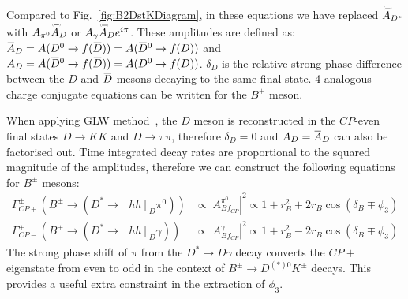 \documentclass[oneside,12pt]{article}
\newcommand{\overbar}[1]{\mkern 1.5mu\overline{\mkern-1.5mu#1\mkern-1.5mu}\mkern
1.5mu}
\newcommand\brobor{\smash[b]{\raisebox{0.6\height}{\scalebox{0.5}{\tiny(}}{\mkern-1.5mu\scriptstyle-\mkern-1.5mu}\raisebox{0.6\height}{\scalebox{0.5}{\tiny)}}}}
\begin{document}
\noindent Compared to Fig.~\ref{fig:B2DstKDiagram}, in these equations we have
replaced $\accentset{\brobor}{A}\phantom{}_{D^{*}}$ with
$A_{\pi^{0}}\accentset{\brobor}{A}\phantom{}_{D}$ or
$A_{\gamma}\accentset{\brobor}{A}\phantom{}_{D}e^{{i\pi}}$. These amplitudes
are defined as: $\overbar{A}_{D}=A(D^{0}\rightarrow
f(\overbar{D}))=A(\overbar{D}^{0}\rightarrow f(D))$ and
$A_{D}=A(\overbar{D}^{0}\rightarrow f(\overbar{D}))=A(D^{0}\rightarrow f(D))$.
$\delta_D$ is the relative strong phase difference between the $D$ and
$\overbar{D}$ mesons decaying to the same final state. 4 analogous charge
conjugate equations can be written for the $B^{+}$ meson. 

When applying GLW method~\cite{GLWRef}, the $D$ meson is reconstructed in the
$CP$-even final states $D\rightarrow KK$ and $D\rightarrow \pi \pi$, therefore
$\delta_D=0$ and $A_{D}=\overbar{A}_{D}$ can also be factorised out. Time integrated decay rates are proportional to the squared magnitude of the amplitudes, therefore we can construct the following equations for $B^{\pm}$ mesons:
  \begin{align}
		\Gamma_{CP+}^{\pm}(B^{\pm}\rightarrow (D^{*}\rightarrow
[hh]_D\pi^{0}))&\propto |A^{\pi^0}_{Bf_{CP}}|^2 \propto 1 + r_{B}^{2} +
2r_{B}\cos(\delta_{B}\mp \phi_{3}) \\
		\Gamma_{CP-}^{\pm}(B^{\pm}\rightarrow (D^{*}\rightarrow
[hh]_D\gamma))&\propto |A^{\gamma}_{Bf_{CP}}|^2 \propto 1 + r_{B}^{2} -
2r_{B}\cos(\delta_{B}\mp \phi_{3})
  \end{align}
\noindent The strong phase shift of $\pi$ from the
$D^{*}\rightarrow D\gamma$ decay converts the $CP+$ eigenstate from even to odd
in the context of $B^{\pm}\rightarrow D^{(*)0}K^{\pm}$ decays. This provides a
useful extra constraint in the extraction of $\phi_3$. 
\end{document}
